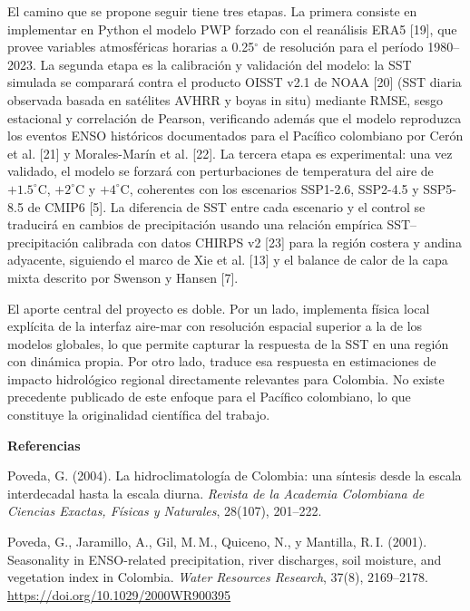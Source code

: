 \documentclass[12pt, letterpaper]{article}
\begin{document}
El camino que se propone seguir tiene tres etapas. La primera consiste en implementar en
Python el modelo PWP forzado con el rean\'alisis ERA5 [19], que provee variables atmosf\'ericas
horarias a 0.25$^\circ$ de resoluci\'on para el per\'iodo 1980--2023. La segunda etapa es
la calibraci\'on y validaci\'on del modelo: la SST simulada se comparar\'a contra el producto
OISST v2.1 de NOAA [20] (SST diaria observada basada en sat\'elites AVHRR y boyas in
situ) mediante RMSE, sesgo estacional y correlaci\'on de Pearson, verificando adem\'as que
el modelo reproduzca los eventos ENSO hist\'oricos documentados para el Pac\'ifico colombiano
por Cer\'on et al. [21] y Morales-Mar\'in et al. [22]. La tercera etapa es experimental: una
vez validado, el modelo se forzar\'a con perturbaciones de temperatura del aire de
$+1.5^\circ$C, $+2^\circ$C y $+4^\circ$C, coherentes con los escenarios SSP1-2.6, SSP2-4.5
	y SSP5-8.5 de CMIP6 [5]. La diferencia de SST entre cada escenario y el control se
	traducir\'a en cambios de precipitaci\'on usando una relaci\'on emp\'irica SST--precipitaci\'on
	calibrada con datos CHIRPS v2 [23] para la regi\'on costera y andina adyacente, siguiendo
	el marco de Xie et al. [13] y el balance de calor de la capa mixta descrito por Swenson y
	Hansen [7].
	
	El aporte central del proyecto es doble. Por un lado, implementa f\'isica local expl\'icita
	de la interfaz aire-mar con resoluci\'on espacial superior a la de los modelos globales,
	lo que permite capturar la respuesta de la SST en una regi\'on con din\'amica propia. Por
	otro lado, traduce esa respuesta en estimaciones de impacto hidrol\'ogico regional directamente
	relevantes para Colombia. No existe precedente publicado de este enfoque para el Pac\'ifico
	colombiano, lo que constituye la originalidad cient\'ifica del trabajo.
	
	\bigskip
	\noindent\textbf{Referencias}
	
	\smallskip
	\noindent [1] Poveda, G. (2004). La hidroclimatolog\'ia de Colombia: una s\'intesis desde la
	escala interdecadal hasta la escala diurna. \textit{Revista de la Academia Colombiana de
		Ciencias Exactas, F\'isicas y Naturales}, 28(107), 201--222.
	
	\noindent [2] Poveda, G., Jaramillo, A., Gil, M.\,M., Quiceno, N., y Mantilla, R.\,I. (2001).
	Seasonality in ENSO-related precipitation, river discharges, soil moisture, and vegetation
	index in Colombia. \textit{Water Resources Research}, 37(8), 2169--2178.
	\url{https://doi.org/10.1029/2000WR900395}
	
\end{document}

